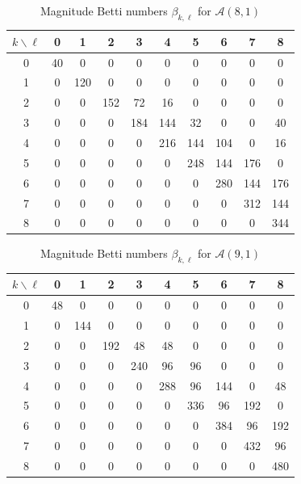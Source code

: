 \documentclass{amsart}
\numberwithin{equation}{section}
\theoremstyle{plain}
\theoremstyle{remark}
\theoremstyle{definition}
\numberwithin{equation}{section}
\newcommand{\A}{\mathcal{A}}
\begin{document}
\begin{table}[htpb]
\centering
\begin{tabular}{c|ccccccccc}
\hline
$k \backslash \ell$ & 0 & 1 & 2 & 3 & 4 & 5 & 6 & 7 & 8 \\
\hline
0 & 40 & 0  & 0  & 0   & 0   & 0   & 0   & 0   &  0\\
1 & 0  & 120 & 0  & 0   & 0   & 0   & 0   & 0   &  0\\
2 & 0  & 0  & 152 & 72  & 16   & 0   & 0   & 0   &  0\\
3 & 0  & 0  & 0  & 184 & 144  & 32  & 0   & 0   & 40\\
4 & 0  & 0  & 0  & 0   & 216 & 144  & 104  & 0   & 16\\
5 & 0  & 0  & 0  & 0   & 0   & 248 & 144  & 176 & 0\\
6 & 0  & 0  & 0  & 0   & 0   & 0   & 280 & 144  & 176\\
7 & 0  & 0  & 0  & 0   & 0   & 0   & 0   & 312 & 144\\
8 & 0  & 0  & 0  & 0   & 0   & 0   & 0   & 0   & 344\\ 
\hline
\end{tabular}
\vspace{1ex}
\caption{Magnitude Betti numbers $\beta_{k,\ell}$ for $\A(8,1)$}
\label{tab:A81}
\end{table}



\begin{table}[htpb]
\centering
\begin{tabular}{c|ccccccccc}
\hline
$k \backslash \ell$ & 0 & 1 & 2 & 3 & 4 & 5 & 6 & 7 & 8 \\
\hline
0 & 48 & 0  & 0  & 0   & 0   & 0   & 0   & 0   &  0\\
1 & 0  & 144 & 0  & 0   & 0   & 0   & 0   & 0   &  0\\
2 & 0  & 0  & 192 & 48  & 48   & 0   & 0   & 0   &  0\\
3 & 0  & 0  & 0  & 240 & 96  & 96  & 0   & 0   & 0\\
4 & 0  & 0  & 0  & 0   & 288 & 96  & 144  & 0   & 48\\
5 & 0  & 0  & 0  & 0   & 0   & 336 & 96  & 192 & 0\\
6 & 0  & 0  & 0  & 0   & 0   & 0   & 384 & 96  & 192\\
7 & 0  & 0  & 0  & 0   & 0   & 0   & 0   & 432 & 96\\
8 & 0  & 0  & 0  & 0   & 0   & 0   & 0   & 0   & 480\\ 
\hline
\end{tabular}
\vspace{1ex}
\caption{Magnitude Betti numbers $\beta_{k,\ell}$ for $\A(9,1)$}
\label{tab:A91}
\end{table}
\end{document}
